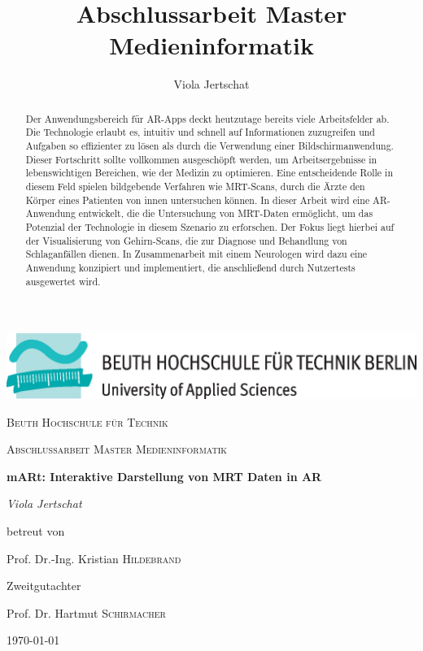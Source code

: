 \documentclass[a4paper,11pt]{report}
\title{Abschlussarbeit Master Medieninformatik}
\author{Viola Jertschat}
\let\oldcite\cite
\renewcommand*\cite[1]{[\oldcite{#1}]}
\begin{document}
\begin{titlepage}
	\centering
	\includegraphics[width=\textwidth]{images/beuthlogo.eps}\par\vspace{1cm}
	{\scshape\LARGE Beuth Hochschule für Technik \par}
	\vspace{1cm}
	{\scshape\Large Abschlussarbeit Master Medieninformatik\par}
	\vspace{1.5cm}
	{\huge\bfseries mARt: Interaktive Darstellung von MRT Daten in AR\par}
	\vspace{2cm}
	{\Large\itshape Viola Jertschat\par}
	\vfill
	betreut von\par
	Prof. Dr.-Ing. Kristian \textsc{Hildebrand}
	
	\vfill
	Zweitgutachter\par
	Prof. Dr. Hartmut \textsc{Schirmacher}

	\vfill

	{\large \today\par}
\end{titlepage}

\begin{abstract} 
Der Anwendungsbereich für AR-Apps deckt heutzutage bereits viele Arbeitsfelder ab. Die Technologie erlaubt es, intuitiv und schnell auf Informationen zuzugreifen und Aufgaben so effizienter zu lösen als durch die Verwendung einer Bildschirmanwendung. Dieser Fortschritt sollte vollkommen ausgeschöpft werden, um Arbeitsergebnisse in lebenswichtigen Bereichen, wie der Medizin zu optimieren. 
Eine entscheidende Rolle in diesem Feld spielen bildgebende Verfahren wie MRT-Scans, durch die Ärzte den Körper eines Patienten von innen untersuchen können. 
In dieser Arbeit wird eine AR-Anwendung entwickelt, die die Untersuchung von MRT-Daten ermöglicht, um das Potenzial der Technologie in diesem Szenario zu erforschen. Der Fokus liegt hierbei auf der Visualisierung von Gehirn-Scans, die zur Diagnose und Behandlung von Schlaganfällen dienen. 
In Zusammenarbeit mit einem Neurologen wird dazu eine Anwendung konzipiert und implementiert, die anschließend durch Nutzertests ausgewertet wird.




\end{abstract}
\end{document}
